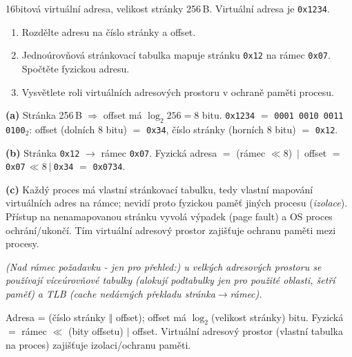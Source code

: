 \begin{zadani}
16bitová virtuální adresa, velikost stránky 256\,B. Virtuální adresa je \texttt{0x1234}.
\begin{enumerate}[label=(\alph*)]
  \item {} Rozdělte adresu na číslo stránky a offset.
  \item {} Jednoúrovňová stránkovací tabulka mapuje stránku \texttt{0x12} na rámec \texttt{0x07}. Spočtěte fyzickou adresu.
  \item {} Vysvětlete roli virtuálních adresových prostoru v ochraně paměti procesu.
\end{enumerate}
\end{zadani}

\begin{reseni}
\textbf{(a)} Stránka 256\,B $\Rightarrow$ offset má $\log_2 256=8$ bitu. \texttt{0x1234} $=$ \texttt{0001\,0010\,0011\,0100}$_2$: offset (dolních 8 bitu) $=$ \texttt{0x34}, číslo stránky (horních 8 bitu) $=$ \texttt{0x12}.

\textbf{(b)} Stránka \texttt{0x12} $\to$ rámec \texttt{0x07}. Fyzická adresa $=$ (rámec $\ll 8$) $\,|\,$ offset $=$ \texttt{0x07}\,$\ll8\ |\ $\texttt{0x34} $=$ \texttt{0x0734}.

\textbf{(c)} Každý proces má vlastní stránkovací tabulku, tedy vlastní mapování virtuálních adres na rámce; nevidí proto fyzickou paměť jiných procesu (\emph{izolace}). Přístup na nenamapovanou stránku vyvolá výpadek (page fault) a OS proces ochrání/ukončí. Tím virtuální adresový prostor zajišťuje ochranu paměti mezi procesy.

\emph{(Nad rámec požadavku - jen pro přehled:) u velkých adresových prostoru se používají \emph{víceúrovňové} tabulky (alokují podtabulky jen pro použité oblasti, šetří paměť) a \emph{TLB} (cache nedávných překladu stránka$\to$rámec).}
\end{reseni}

\begin{jadro}
Adresa = (číslo stránky $\Vert$ offset); offset má $\log_2$(velikost stránky) bitu. Fyzická $=$ rámec $\ll$ (bity offsetu) $|$ offset. Virtuální adresový prostor (vlastní tabulka na proces) zajišťuje izolaci/ochranu paměti.
\end{jadro}

